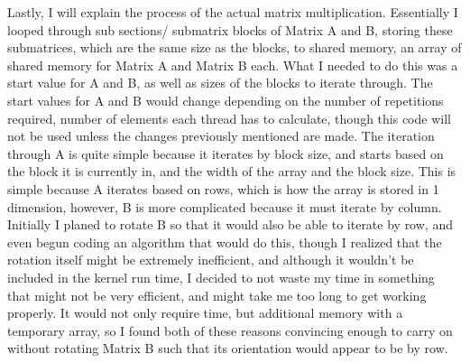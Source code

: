 \documentclass[8pt]{article}
\begin{document}
Lastly, I will explain the process of the actual matrix multiplication.  Essentially I looped through sub sections/ submatrix blocks of Matrix A and B, storing these submatrices, which are the same size as the blocks, to shared memory, an array of shared memory for Matrix A and Matrix B each.  What I needed to do this was a start value for A and B, as well as sizes of the blocks to iterate through.  The start values for A and B would change depending on the number of repetitions required, number of elements each thread has to calculate, though this code will not be used unless the changes previously mentioned are made.  The iteration through A is quite simple because it iterates by block size, and starts based on the block it is currently in, and the width of the array and the block size.  This is simple because A iterates based on rows, which is how the array is stored in 1 dimension, however, B is more complicated because it must iterate by column.  Initially I planed to rotate B so that it would also be able to iterate by row, and even begun coding an algorithm that would do this, though I realized that the rotation itself might be extremely inefficient, and although it wouldn't be included in the kernel run time, I decided to not waste my time in something that might not be very efficient, and might take me too long to get working properly.  It would not only require time, but additional memory with a temporary array, so I found both of these reasons convincing enough to carry on without rotating Matrix B such that its orientation would appear to be by row.\\
\end{document}
